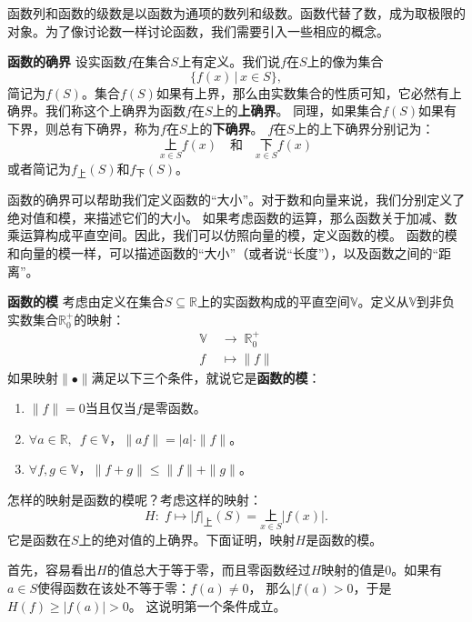 \documentclass[12pt,UTF8,fontset=none]{ctexbook}
\begin{document}
\begin{appendix}
函数列和函数的级数是以函数为通项的数列和级数。函数代替了数，成为取极限的对象。为了像讨论数一样讨论函数，我们需要引入一些相应的概念。

\begin{df}{\textbf{函数的确界}}
    设实函数$f$在集合$S$上有定义。我们说$f$在$S$上的像为集合
    $$ \{f(x) \,|\, x\in S\}, $$
    简记为$f(S)$。集合$f(S)$如果有上界，那么由实数集合的性质可知，它必然有上确界。我们称这个上确界为函数$f$在$S$上的\textbf{上确界}。
    同理，如果集合$f(S)$如果有下界，则总有下确界，称为$f$在$S$上的\textbf{下确界}。
    $f$在$S$上的上下确界分别记为：
    $$ \underset{x\in S}{\text{上}} f(x) \quad \mbox{和} \quad \underset{x\in S}{\text{下}} f(x)$$
    或者简记为$f_{\text{上}}(S)$和$f_{\text{下}}(S)$。
\end{df}

函数的确界可以帮助我们定义函数的“大小”。对于数和向量来说，我们分别定义了绝对值和模，来描述它们的大小。
如果考虑函数的运算，那么函数关于加减、数乘运算构成平直空间。因此，我们可以仿照向量的模，定义函数的模。
函数的模和向量的模一样，可以描述函数的“大小”（或者说“长度”），以及函数之间的“距离”。
\begin{df}{\textbf{函数的模}}
    考虑由定义在集合$S\subseteq\mathbb{R}$上的实函数构成的平直空间$\mathbb{V}$。定义从$\mathbb{V}$到非负实数集合$\mathbb{R}_0^+$的映射：
    \begin{align*}
        \mathbb{V} \; &\rightarrow  \; \mathbb{R}_0^+ \\
        f &\mapsto \|f\|
    \end{align*}
    如果映射$\|\bullet \|$满足以下三个条件，就说它是\textbf{函数的模}：
    \begin{enumerate}
        \item $\|f\| = 0$当且仅当$f$是零函数。
        \item $\forall a\in\mathbb{R},\,\,\,f \in \mathbb{V}$，$\|af\| = |a| \cdot \|f\|$。
        \item $\forall f,g \in \mathbb{V}$，$\|f + g\| \leqslant \|f\| + \|g\|$。
    \end{enumerate}
\end{df}

怎样的映射是函数的模呢？考虑这样的映射：
$$ H:\; f \mapsto |f|_{\text{上}}(S) = \underset{x\in S}{\text{上}} |f(x)|. $$
它是函数在$S$上的绝对值的上确界。下面证明，映射$H$是函数的模。

首先，容易看出$H$的值总大于等于零，而且零函数经过$H$映射的值是$0$。如果有$a\in S$使得函数在该处不等于零：$f(a)\neq 0$，
那么$|f(a)>0$，于是$H(f) \geqslant |f(a)| > 0$。
这说明第一个条件成立。


\end{appendix}
\end{document}
